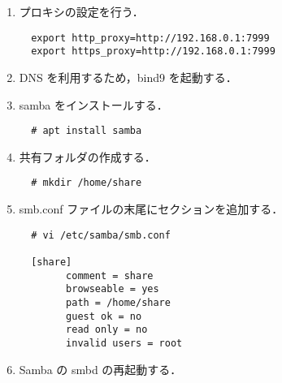 \documentclass[a4j,titlepage]{jarticle}
\begin{document}
\begin{enumerate}
\item プロキシの設定を行う．

  \begin{center}
    \begin{screen}
\begin{verbatim}
  export http_proxy=http://192.168.0.1:7999
  export https_proxy=http://192.168.0.1:7999
\end{verbatim}
    \end{screen}
    \end{center}
 
    \item DNS を利用するため，bind9 を起動する．

\item samba をインストールする．

  \begin{center}
    \begin{screen}
\begin{verbatim}
  # apt install samba
\end{verbatim}
    \end{screen}
    \end{center}
  
    \item 共有フォルダの作成する．

  \begin{center}
    \begin{screen}
\begin{verbatim}
  # mkdir /home/share
\end{verbatim}
    \end{screen}
    \end{center}

    \item smb.conf ファイルの末尾にセクションを追加する．

  \begin{center}
    \begin{screen}
\begin{verbatim}
  # vi /etc/samba/smb.conf

  [share]
        comment = share
        browseable = yes
        path = /home/share
        guest ok = no
        read only = no
        invalid users = root
\end{verbatim}
    \end{screen}
    \end{center}

    \item Samba の smbd の再起動する．
      

\end{enumerate}
\end{document}
